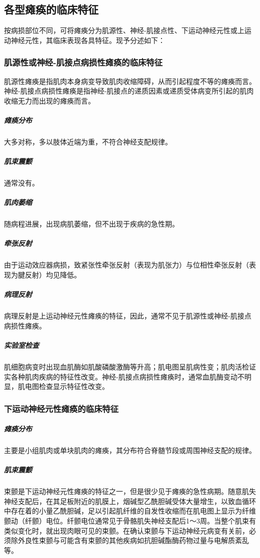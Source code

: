 \subsection{各型瘫痪的临床特征}

按病损部位不同，可将瘫痪分为肌源性、神经-肌接点性、下运动神经元性或上运动神经元性，其临床表现各具特征。现予分述如下：

\subsubsection{肌源性或神经-肌接点病损性瘫痪的临床特征}

肌源性瘫痪是指肌肉本身病变导致肌肉收缩障碍，从而引起程度不等的瘫痪而言。神经-肌接点病损性瘫痪是指神经-肌接点的递质因素或递质受体病变所引起的肌肉收缩无力而出现的瘫痪而言。

\subparagraph{瘫痪分布}

大多对称，多以肢体近端为重，不符合神经支配规律。

\subparagraph{肌束震颤}

通常没有。

\subparagraph{肌肉萎缩}

随病程进展，出现病肌萎缩，但不出现于疾病的急性期。

\subparagraph{牵张反射}

由于运动效应器病损，致紧张性牵张反射（表现为肌张力）与位相性牵张反射（表现为腱反射）均见降低。

\subparagraph{病理反射}

病理反射是上运动神经元性瘫痪的特征，因此，通常不见于肌源性或神经-肌接点病损性瘫痪。

\subparagraph{实验室检查}

肌细胞病变时出现血肌酶如肌酸磷酸激酶等升高；肌电图呈肌病性变；肌肉活检证实各种肌肉疾病的特征性改变。神经-肌接点病损性瘫痪时，通常血肌酶变动不明显，肌电图检查显示特征性改变。

\subsubsection{下运动神经元性瘫痪的临床特征}

\subparagraph{瘫痪分布}

主要是小组肌肉或单块肌肉的瘫痪，其分布符合脊髄节段或周围神经支配的规律。

\subparagraph{肌束震颤}

束颤是下运动神经元性瘫痪的特征之一，但是很少见于瘫痪的急性病期。随意肌失神经支配后，在其足板附近的肌膜上，烟碱型乙酰胆碱受体大量增生，以致血循环中存在着的小量乙酰胆碱，足以引起肌纤维的自发性收缩而在肌电图上显示为纤维颤动（纤颤）电位。纤颤电位通常见于骨骼肌失神经支配后1～3周。当整个肌束有类似变化时，就出现肉眼可见的束颤。在确认束颤与下运动神经元病变有关前，必须除外良性束颤与可能含有束颤的其他疾病如抗胆碱酯酶药物过量与电解质紊乱等。

